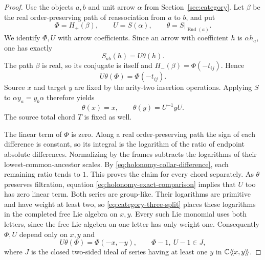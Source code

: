 \begin{proof}
Use the objects $a,b$ and unit arrow $\alpha$ from
Section~\ref{sec:category}.  Let $\beta$ be the real order-preserving
path of reassociation from $a$ to $b$, and put
\[
 \Phi=H_+(\beta),\qquad U=S(\alpha),\qquad
 \theta=S|_{\operatorname{End}(a)}.
\]
We identify $\Phi,U$ with arrow coefficients.  Since an arrow with
coefficient $h$ is $\alpha h_a$, one has exactly
\begin{equation}\label{eq:holonomy-arrow-action}
 S_{ab}(h)=U\theta(h).
\end{equation}
The path $\beta$ is real, so its conjugate is itself and
$H_-(\beta)=\Phi(-t_{ij})$.  Hence
\begin{equation}\label{eq:holonomy-exact-comparison}
 U\theta(\Phi)=\Phi(-t_{ij}).
\end{equation}
Source $x$ and target $y$ are fixed by the arity-two insertion
operations.  Applying $S$ to $\alpha y_a=y_b\alpha$ therefore yields
\begin{equation}\label{eq:holonomy-source-action}
 \theta(x)=x,\qquad \theta(y)=U^{-1}yU.
\end{equation}
The source total chord $T$ is fixed as well.

The linear term of $\Phi$ is zero.  Along a real order-preserving
path the sign of each difference is constant, so its integral is the
logarithm of the ratio of endpoint absolute differences.  Normalizing
by the frames subtracts the logarithms of their lowest-common-ancestor
scales.  By \eqref{eq:holonomy-collar-difference}, each remaining
ratio tends to $1$.  This proves the claim for every chord separately.
As $\theta$ preserves filtration, equation
\eqref{eq:holonomy-exact-comparison} implies that $U$ too has zero
linear term.  Both series are group-like.  Their logarithms are
primitive and have weight at least two, so
\eqref{eq:category-three-split} places these logarithms in the
completed free Lie algebra on $x,y$.  Every such Lie monomial uses
both letters, since the free Lie algebra on one letter has only
weight one.  Consequently $\Phi,U$ depend only on $x,y$ and
\begin{equation}\label{eq:holonomy-exact-xy}
 U\theta(\Phi)=\Phi(-x,-y),\qquad
 \Phi-1,\ U-1\in J,
\end{equation}
where $J$ is the closed two-sided ideal of series having at least one
$y$ in $\mathbb C\langle\!\langle x,y\rangle\!\rangle$.


\end{proof}
